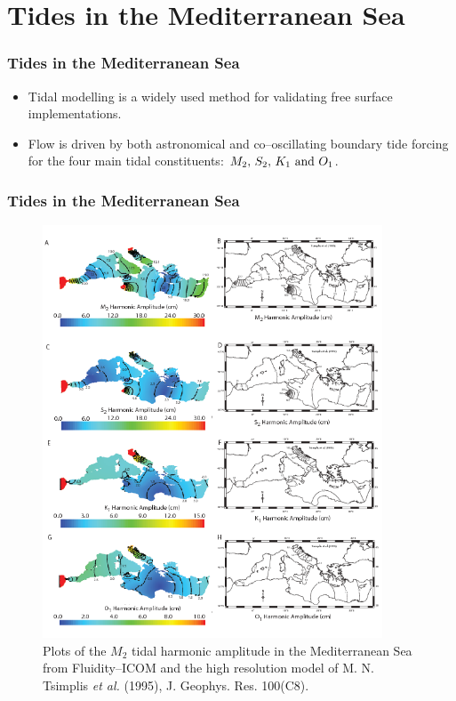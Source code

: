 \section{Tides in the Mediterranean Sea}

\begin{frame}
    \frametitle{Tides in the Mediterranean Sea}
\begin{itemize}
\item Tidal modelling is a widely used method for validating free surface implementations.
\item Flow is driven by both astronomical and co--oscillating boundary tide forcing for the four main tidal constituents: \mbox{$M_2, \, S_2, \, K_1 \,\, {\rm and} \,\, O_1$}.
\end{itemize}
\end{frame}
%
\begin{frame}
    \frametitle{Tides in the Mediterranean Sea}
\begin{figure}
\centering
\includegraphics[width=0.9\textwidth, clip = True, trim = 5mm 180mm 0mm 0mm]{./tides_in_the_Mediterranean_Sea/amp.png}
\caption{Plots of the $M_2$ tidal harmonic amplitude in the Mediterranean Sea from Fluidity--ICOM and the high resolution
model of M. N. Tsimplis {\it et al.} (1995), J. Geophys. Res. 100(C8).}
\end{figure}
\end{frame}
